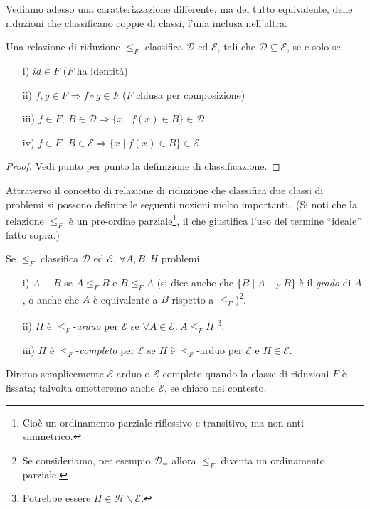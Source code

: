 \noindent Vediamo adesso una caratterizzazione differente, ma del tutto equivalente, delle riduzioni che classificano coppie di classi, l'una inclusa nell'altra.

\begin{lemma}
    \label{classificazione_lemma}
    Una relazione di riduzione $\leqslant_F$ classifica $\mathcal{D}$ ed $\mathcal{E}$, tali che $\mathcal{D} \subseteq \mathcal{E}$, se e solo se
    \begin{itemize}
        \item[i)] $\mathit{id} \in F$ \hfill ($F$ ha identità)
        \item[ii)] $f,g \in F \Rightarrow f \circ g \in F$ \hfill ($F$ chiusa per composizione)
        \item[iii)] $f \in F,\ B \in \mathcal{D} \Rightarrow \{x \mid f(x) \in B\} \in \mathcal{D}$
        \item[iv)] $f \in F,\ B \in \mathcal{E} \Rightarrow \{x \mid f(x) \in B\} \in \mathcal{E}$
    \end{itemize}
\end{lemma}

\begin{proof}
    Vedi punto per punto la definizione di classificazione.
\end{proof}

\noindent Attraverso il concetto di relazione di riduzione che classifica due classi di problemi si possono definire le seguenti nozioni molto importanti.\
(Si noti che la relazione $\leqslant_F$ è un pre-ordine parziale\footnote{Cioè un ordinamento parziale riflessivo e transitivo, ma non anti-simmetrico.}, il che giustifica l'uso del termine ``ideale'' fatto sopra.)

\newpage

\begin{definition}
    \label{arduo_completo}
    Se $\leqslant_F$ classifica $\mathcal{D}$ ed $\mathcal{E}$, $\forall A,B,H$ problemi
    \begin{itemize}
        \item[i)] $A\equiv B$ se $A \leqslant_F B$ e $B \leqslant_F A$ (si dice anche che $\{B \mid A \equiv_F B\}$ è il \textit{grado} di $A$, o anche che $A$ è equivalente a $B$ rispetto a $\leqslant_F$)\footnote{Se consideriamo, per esempio $\mathcal{D}_{\equiv}$ allora $\leqslant_F$ diventa un ordinamento parziale.}.
        \item[ii)] $H$ è $\leqslant_F$-\textit{arduo} per $\mathcal{E}$ se $\forall A \in \mathcal{E}.\ A \leqslant_F H$ \footnote{Potrebbe essere $H \in \mathcal{H}\backslash\mathcal{E}$.}.
        \item[iii)] $H$ è $\leqslant_F$-\textit{completo} per $\mathcal{E}$ se $H$ è $\leqslant_F$-arduo per $\mathcal{E}$ e $H \in \mathcal{E}$.
    \end{itemize}
    Diremo semplicemente $\mathcal{E}$-arduo o $\mathcal{E}$-completo quando la classe di riduzioni $F$ è fissata; talvolta ometteremo anche $\mathcal{E}$, se chiaro nel contesto.

\end{definition}

